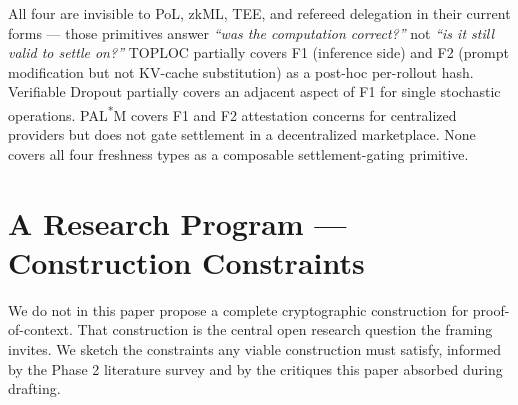 \documentclass[11pt]{article}
\begin{document}
All four are invisible to PoL, zkML, TEE, and refereed delegation in their current forms --- those primitives answer \emph{``was the computation correct?''} not \emph{``is it still valid to settle on?''} TOPLOC partially covers F1 (inference side) and F2 (prompt modification but not KV-cache substitution) as a post-hoc per-rollout hash. Verifiable Dropout partially covers an adjacent aspect of F1 for single stochastic operations. PAL\textsuperscript{*}M covers F1 and F2 attestation concerns for centralized providers but does not gate settlement in a decentralized marketplace. None covers all four freshness types as a composable settlement-gating primitive.

\section{A Research Program --- Construction Constraints}

We do not in this paper propose a complete cryptographic construction for proof-of-context. That construction is the central open research question the framing invites. We sketch the constraints any viable construction must satisfy, informed by the Phase 2 literature survey and by the critiques this paper absorbed during drafting.
\end{document}

